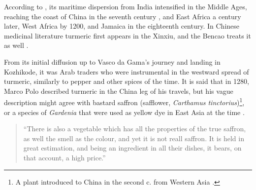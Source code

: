 According to \textcite[2]{nair_turmeric_2019}, its maritime dispersion from India intensified in the Middle Ages, reaching the coast of China in the seventh century \AD{}, and East Africa a century later, West Africa by 1200, and Jamaica in the eighteenth century. In Chinese medicinal literature turmeric first appears in the \gls{Xinxiu}, and the \gls{Bencao} treats it as well \autocite{feng_molecular_2011}. 

From its initial diffusion up to Vasco da Gama's journey and landing in Kozhikode, it was Arab traders who were instrumental in the westward spread of turmeric, similarly to pepper and other spices of the time. It is said that in 1280, Marco Polo described turmeric in the China leg of his travels, but his vague description might agree with bastard saffron (safflower, \textit{Carthamus tinctorius})\footnote{A plant introduced to China in the second c. \BC{} from Western Asia \autocite[226]{polo_travels_2004}.}, or a species of \textit{Gardenia} that were used as yellow dye in East Asia at the time \autocite[226]{polo_travels_2004}.


\begin{quote}
	``There is also a vegetable which has all the properties of the true saffron, as well the smell as the colour, and yet it is not reall saffron. It is held in great estimation, and being an ingredient in all their dishes, it bears, on that account, a high price.'' \autocite[251-252]{komroff_travels_1926}
\end{quote}


